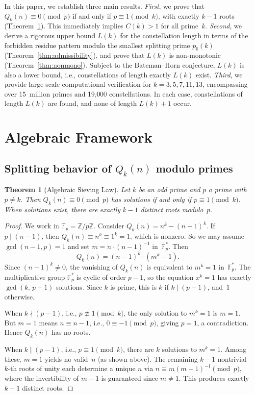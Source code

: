 \documentclass[11pt,a4paper]{article}
\newtheorem{theorem}{Theorem}[section]
\newcommand{\Qk}{Q_k}
\newcommand{\Fp}{\mathbb{F}_p}
\newcommand{\Fpstar}{\mathbb{F}_p^*}
\newcommand{\ZZ}{\mathbb{Z}}
\begin{document}
In this paper, we establish three main results.
\emph{First}, we prove that $\Qk(n) \equiv 0 \pmod{p}$ if and only if $p \equiv 1 \pmod{k}$, with exactly $k-1$ roots (Theorem~\ref{thm:sieving}). This immediately implies $C(k) > 1$ for all prime~$k$.
\emph{Second}, we derive a rigorous upper bound $L(k)$ for the constellation length in terms of the forbidden residue pattern modulo the smallest splitting prime $p_0(k)$ (Theorem~\ref{thm:admissibility}), and prove that $L(k)$ is non-monotonic (Theorem~\ref{thm:nonmono}). Subject to the Bateman--Horn conjecture, $L(k)$ is also a lower bound, i.e., constellations of length exactly $L(k)$ exist.
\emph{Third}, we provide large-scale computational verification for $k = 3, 5, 7, 11, 13$, encompassing over 15~million primes and 19,000 constellations. In each case, constellations of length $L(k)$ are found, and none of length $L(k)+1$ occur.

\section{Algebraic Framework}

\subsection{Splitting behavior of $\Qk(n)$ modulo primes}

\begin{theorem}[Algebraic Sieving Law]\label{thm:sieving}
Let $k$ be an odd prime and $p$ a prime with $p \ne k$. Then $\Qk(n) \equiv 0 \pmod{p}$ has solutions if and only if $p \equiv 1 \pmod{k}$. When solutions exist, there are exactly $k-1$ distinct roots modulo~$p$.
\end{theorem}

\begin{proof}
We work in $\Fp = \ZZ/p\ZZ$. Consider $\Qk(n) = n^k - (n-1)^k$. If $p \mid (n-1)$, then $\Qk(n) \equiv n^k \equiv 1^k = 1$, which is nonzero. So we may assume $\gcd(n-1, p) = 1$ and set $m = n \cdot (n-1)^{-1}$ in~$\Fpstar$. Then
\[
  \Qk(n) = (n-1)^k \cdot (m^k - 1).
\]
Since $(n-1)^k \ne 0$, the vanishing of $\Qk(n)$ is equivalent to $m^k = 1$ in~$\Fpstar$. The multiplicative group $\Fpstar$ is cyclic of order $p-1$, so the equation $x^k = 1$ has exactly $\gcd(k,\, p-1)$ solutions. Since $k$ is prime, this is $k$ if $k \mid (p-1)$, and~$1$ otherwise.

When $k \nmid (p-1)$, i.e., $p \not\equiv 1 \pmod{k}$, the only solution to $m^k = 1$ is $m = 1$. But $m = 1$ means $n \equiv n - 1$, i.e., $0 \equiv -1 \pmod{p}$, giving $p = 1$, a contradiction. Hence $\Qk(n)$ has no roots.

When $k \mid (p-1)$, i.e., $p \equiv 1 \pmod{k}$, there are $k$ solutions to $m^k = 1$. Among these, $m = 1$ yields no valid~$n$ (as shown above). The remaining $k-1$ nontrivial $k$-th roots of unity each determine a unique $n$ via $n \equiv m(m-1)^{-1} \pmod{p}$, where the invertibility of $m-1$ is guaranteed since $m \ne 1$. This produces exactly $k-1$ distinct roots.
\end{proof}
\end{document}
